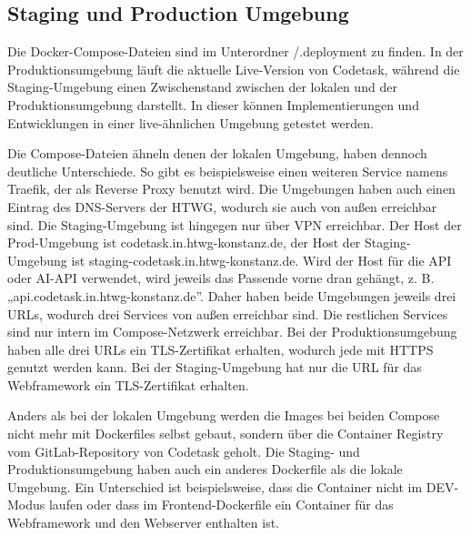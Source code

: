 \subsection{Staging und Production Umgebung}

Die Docker-Compose-Dateien sind im Unterordner /.deployment zu finden.
In der Produktionsumgebung läuft die aktuelle Live-Version von Codetask, während die Staging-Umgebung einen Zwischenstand zwischen der lokalen und der Produktionsumgebung darstellt.
In dieser können Implementierungen und Entwicklungen in einer live-ähnlichen Umgebung getestet werden.

Die Compose-Dateien ähneln denen der lokalen Umgebung, haben dennoch deutliche Unterschiede.
So gibt es beispielsweise einen weiteren Service namens Traefik, der als Reverse Proxy benutzt wird. 
Die Umgebungen haben auch einen Eintrag des DNS-Servers der HTWG, wodurch sie auch von außen erreichbar sind. Die Staging-Umgebung ist hingegen nur über VPN erreichbar.
Der Host der Prod-Umgebung ist codetask.in.htwg-konstanz.de, der Host der Staging-Umgebung ist staging-codetask.in.htwg-konstanz.de. Wird der Host für die API oder AI-API verwendet, wird jeweils das Passende vorne dran gehängt, z. B. „api.codetask.in.htwg-konstanz.de”.
Daher haben beide Umgebungen jeweils drei URLs, wodurch drei Services von außen erreichbar sind. Die restlichen Services sind nur intern im Compose-Netzwerk erreichbar.
Bei der Produktionsumgebung haben alle drei URLs ein TLS-Zertifikat erhalten, wodurch jede mit HTTPS genutzt werden kann. Bei der Staging-Umgebung hat nur die URL für das Webframework ein TLS-Zertifikat erhalten.

Anders als bei der lokalen Umgebung werden die Images bei beiden Compose nicht mehr mit Dockerfiles selbst gebaut, sondern über die Container Registry vom GitLab-Repository von Codetask geholt.
Die Staging- und Produktionsumgebung haben auch ein anderes Dockerfile als die lokale Umgebung. Ein Unterschied ist beispielsweise, dass die Container nicht im DEV-Modus laufen oder dass im Frontend-Dockerfile ein Container für das Webframework und den Webserver enthalten ist.